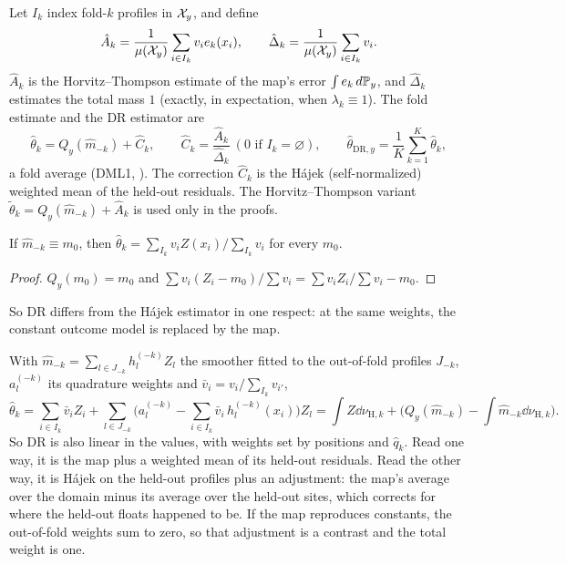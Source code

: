 Let $I_k$ index fold-$k$ profiles in $\mathcal{X}_y$, and define
\[
  \hat A_k=\frac1{\mu(\mathcal{X}_y)}\sum_{i\in I_k}v_ie_k(x_i),\qquad
  \hat\Delta_k=\frac1{\mu(\mathcal{X}_y)}\sum_{i\in I_k}v_i .
\]
$\hat A_k$ is the Horvitz--Thompson estimate of the map's error $\int e_k\,d\mathbb{P}_y$, and $\hat\Delta_k$
estimates the total mass $1$ (exactly, in expectation, when $\lambda_k\equiv1$). The fold estimate and
the DR estimator are
\[
  \hat\theta_k=Q_y(\hat m_{-k})+\hat C_k,\qquad \hat C_k=\frac{\hat A_k}{\hat\Delta_k}
  \ (0\text{ if }I_k=\varnothing),\qquad
  \hat\theta_{\mathrm{DR},y}=\frac1K\sum_{k=1}^K\hat\theta_k ,
\]
a fold average (DML1, \citealp{chernozhukov2018}). The correction $\hat C_k$ is the Hájek
(self-normalized) weighted mean of the held-out residuals. The Horvitz--Thompson variant
$\tilde\theta_k=Q_y(\hat m_{-k})+\hat A_k$ is used only in the proofs.

\begin{proposition}\label{prop:hajek-is-dr}
If $\hat m_{-k}\equiv m_0$, then $\hat\theta_k=\sum_{I_k}v_iZ(x_i)/\sum_{I_k}v_i$ for every $m_0$.
\end{proposition}

\begin{proof}
$Q_y(m_0)=m_0$ and $\sum v_i(Z_i-m_0)/\sum v_i=\sum v_iZ_i/\sum v_i-m_0$.
\end{proof}

So DR differs from the Hájek estimator in one respect: at the same weights, the constant outcome model
is replaced by the map.

\begin{remark}\label{rem:dr-linear}
With $\hat m_{-k}=\sum_{l\in J_{-k}}h^{(-k)}_lZ_l$ the smoother fitted to the out-of-fold profiles
$J_{-k}$, $a^{(-k)}_l$ its quadrature weights and $\bar v_i=v_i/\sum_{I_k}v_{i'}$,
\[
  \hat\theta_k=\sum_{i\in I_k}\bar v_iZ_i+\sum_{l\in J_{-k}}\Big(a^{(-k)}_l-\sum_{i\in I_k}\bar v_i\,h^{(-k)}_l(x_i)\Big)Z_l
  =\int Z\dd\nu_{\mathrm H,k}+\Big(Q_y(\hat m_{-k})-\int\hat m_{-k}\dd\nu_{\mathrm H,k}\Big).
\]
So DR is also linear in the values, with weights set by positions and $\hat q_k$. Read one way, it is
the map plus a weighted mean of its held-out residuals. Read the other way, it is Hájek on the held-out
profiles plus an adjustment: the map's average over the domain minus its average over the held-out
sites, which corrects for where the held-out floats happened to be. If the map reproduces constants, the
out-of-fold weights sum to zero, so that adjustment is a contrast and the total weight is one.
\end{remark}

